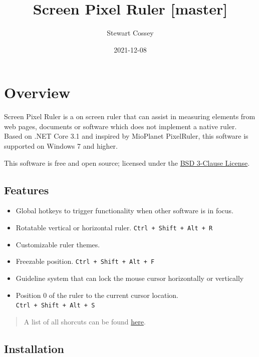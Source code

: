 \documentclass[
]{book}
\title{Screen Pixel Ruler {[}master{]}}
\author{Stewart Cossey}
\date{2021-12-08}
\providecommand{\tightlist}{%
  \setlength{\itemsep}{0pt}\setlength{\parskip}{0pt}}
\begin{document}
\maketitle

{
\setcounter{tocdepth}{1}
\tableofcontents
}
\hypertarget{overview}{%
\chapter{Overview}\label{overview}}

Screen Pixel Ruler is a on screen ruler that can assist in measuring elements from web pages, documents or software which does not implement a native ruler.
Based on .NET Core 3.1 and inspired by MioPlanet PixelRuler, this software is supported on Windows 7 and higher.

This software is free and open source; licensed under the \href{https://opensource.org/licenses/BSD-3-Clause}{BSD 3-Clause License}.

\hypertarget{features}{%
\section{Features}\label{features}}

\begin{itemize}
\tightlist
\item
  Global hotkeys to trigger functionality when other software is in focus.
\item
  Rotatable vertical or horizontal ruler. \texttt{Ctrl\ +\ Shift\ +\ Alt\ +\ R}
\item
  Customizable ruler themes.
\item
  Freezable position. \texttt{Ctrl\ +\ Shift\ +\ Alt\ +\ F}
\item
  Guideline system that can lock the mouse cursor horizontally or vertically
\item
  Position 0 of the ruler to the current cursor location. \texttt{Ctrl\ +\ Shift\ +\ Alt\ +\ S}
\end{itemize}

\begin{quote}
A list of all shorcuts can be found \protect\hyperlink{keyboard}{here}.
\end{quote}

\hypertarget{installation}{%
\section{Installation}\label{installation}}
\end{document}
